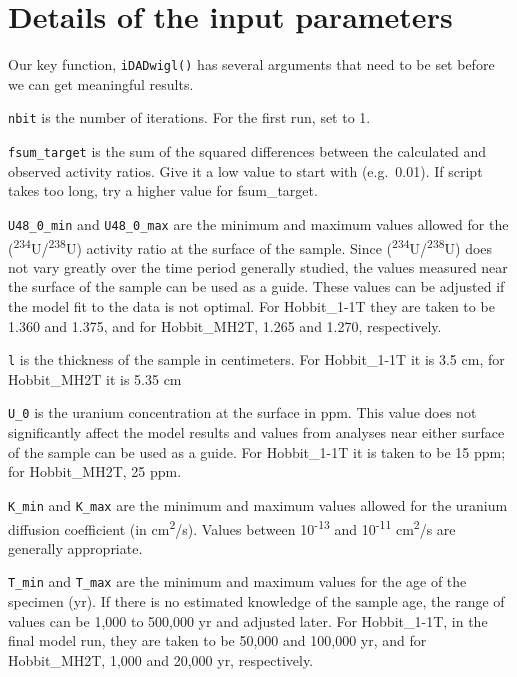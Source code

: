 \documentclass[]{elsarticle} %
\begin{document}
\hypertarget{details-of-the-input-parameters}{%
\section{Details of the input parameters}\label{details-of-the-input-parameters}}

Our key function, \texttt{iDADwigl()} has several arguments that need to be set before we can get meaningful results.

\texttt{nbit} is the number of iterations. For the first run, set to 1.

\texttt{fsum\_target} is the sum of the squared differences between the calculated and observed activity ratios. Give it a low value to start with (e.g.~0.01). If script takes too long, try a higher value for fsum\_target.

\texttt{U48\_0\_min} and \texttt{U48\_0\_max} are the minimum and maximum values allowed for the (\textsuperscript{234}U/\textsuperscript{238}U) activity ratio at the surface of the sample. Since (\textsuperscript{234}U/\textsuperscript{238}U) does not vary greatly over the time period generally studied, the values measured near the surface of the sample can be used as a guide. These values can be adjusted if the model fit to the data is not optimal. For Hobbit\_1-1T they are taken to be 1.360 and 1.375, and for Hobbit\_MH2T, 1.265 and 1.270, respectively.

\texttt{l} is the thickness of the sample in centimeters. For Hobbit\_1-1T it is 3.5 cm, for Hobbit\_MH2T it is 5.35 cm

\texttt{U\_0} is the uranium concentration at the surface in ppm. This value does not significantly affect the model results and values from analyses near either surface of the sample can be used as a guide. For Hobbit\_1-1T it is taken to be 15 ppm; for Hobbit\_MH2T, 25 ppm.

\texttt{K\_min} and \texttt{K\_max} are the minimum and maximum values allowed for the uranium diffusion coefficient (in cm\textsuperscript{2}/s). Values between 10\textsuperscript{-13} and 10\textsuperscript{-11} cm\textsuperscript{2}/s are generally appropriate.

\texttt{T\_min} and \texttt{T\_max} are the minimum and maximum values for the age of the specimen (yr). If there is no estimated knowledge of the sample age, the range of values can be 1,000 to 500,000 yr and adjusted later. For Hobbit\_1-1T, in the final model run, they are taken to be 50,000 and 100,000 yr, and for Hobbit\_MH2T, 1,000 and 20,000 yr, respectively.
\end{document}
